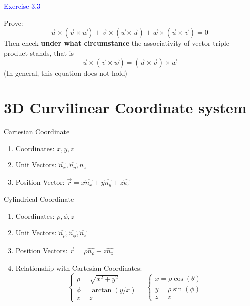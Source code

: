\documentclass{beamer}
\begin{document}
\begin{frame}
\textcolor{blue}{Exercise 3.3}

Prove:$$
\vec{u}\times (\vec{v}\times \vec{w})+\vec{v}\times(\vec{w}\times \vec{u})+\vec{w}\times(\vec{u}\times\vec{v})=0$$
Then check \textbf{under what circumstance} the associativity of vector triple product stands, that is $$\vec{u}\times (\vec{v}\times \vec{w}) = (\vec{u}\times \vec{v})\times \vec{w}$$
(In general, this equation does not hold)
\end{frame}

\section{3D Curvilinear Coordinate system}
\begin{frame}{Cartesian Coordinate}
  \begin{enumerate}
    \item Coordinates: $x, y, z$
    \item Unit Vectors: $\hat{n_x}, \hat{n_y}, \hat{n_z}$
    \item Position Vector: $\vec{r} = x\hat{n_x}+y\hat{n_y}+z\hat{n_z}$
  \end{enumerate}
\end{frame}

\begin{frame}{Cylindrical Coordinate}
  \begin{enumerate}
    \item Coordinates: $\rho, \phi, z$
    \item Unit Vectors: $\hat{n_\rho}, \hat{n_\phi}, \hat{n_z}$
    \item Position Vectors: $\vec{r} = \rho\hat{n_\rho}+z\hat{n_z}$
    \item Relationship with Cartesian Coordinates:
    $$\left\{\begin{array} { l } 
      { \rho = \sqrt { x ^ { 2 } + y ^ { 2 } } } \\
      { \phi = \operatorname { a r c t a n } ( y / x ) } \\
      { z = z }
      \end{array} \quad \left\{\begin{array}{l}
      x=\rho \cos (\theta) \\
      y=\rho \sin (\phi) \\
      z=z
      \end{array}\right.\right.$$
  \end{enumerate}
\end{frame}
\end{document}
